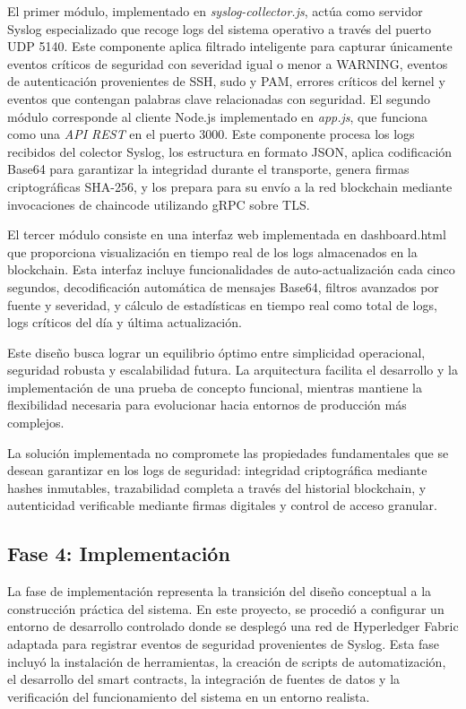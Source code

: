 El primer módulo, implementado en \textit{syslog-collector.js}, actúa como servidor Syslog especializado que recoge logs del sistema operativo a través del puerto UDP 5140. Este componente aplica filtrado inteligente para capturar únicamente eventos críticos de seguridad con severidad igual o menor a WARNING, eventos de autenticación provenientes de SSH, sudo y PAM, errores críticos del kernel y eventos que contengan palabras clave relacionadas con seguridad.
El segundo módulo corresponde al cliente Node.js implementado en \textit{app.js}, que funciona como una \textit{API REST} en el puerto 3000. Este componente procesa los logs recibidos del colector Syslog, los estructura en formato JSON, aplica codificación Base64 para garantizar la integridad durante el transporte, genera firmas criptográficas SHA-256, y los prepara para su envío a la red blockchain mediante invocaciones de chaincode utilizando gRPC sobre TLS.

El tercer módulo consiste en una interfaz web implementada en dashboard.html que proporciona visualización en tiempo real de los logs almacenados en la blockchain. Esta interfaz incluye funcionalidades de auto-actualización cada cinco segundos, decodificación automática de mensajes Base64, filtros avanzados por fuente y severidad, y cálculo de estadísticas en tiempo real como total de logs, logs críticos del día y última actualización.

Este diseño busca lograr un equilibrio óptimo entre simplicidad operacional, seguridad robusta y escalabilidad futura. La arquitectura facilita el desarrollo y la implementación de una prueba de concepto funcional, mientras mantiene la flexibilidad necesaria para evolucionar hacia entornos de producción más complejos.

La solución implementada no compromete las propiedades fundamentales que se desean garantizar en los logs de seguridad: integridad criptográfica mediante hashes inmutables, trazabilidad completa a través del historial blockchain, y autenticidad verificable mediante firmas digitales y control de acceso granular.

\subsection{Fase 4: Implementación}
La fase de implementación representa la transición del diseño conceptual a la construcción práctica del sistema. En este proyecto, se procedió a configurar un entorno de desarrollo controlado donde se desplegó una red de Hyperledger Fabric adaptada para registrar eventos de seguridad provenientes de Syslog. Esta fase incluyó la instalación de herramientas, la creación de scripts de automatización, el desarrollo del smart contracts, la integración de fuentes de datos y la verificación del funcionamiento del sistema en un entorno realista.

